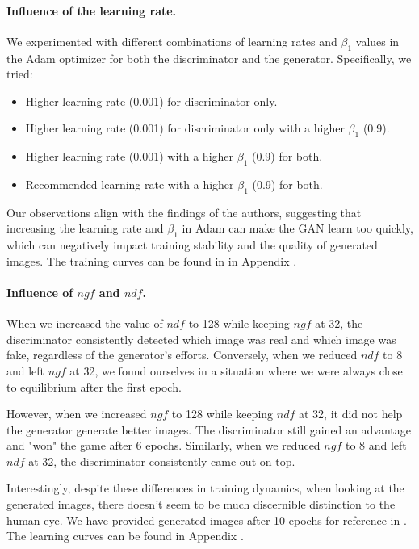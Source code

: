 \paragraph*{Influence of the learning rate.} We experimented with different combinations of learning rates and $\beta_1$ values in the Adam optimizer for both the discriminator and the generator. Specifically, we tried:

\begin{itemize}
    \item Higher learning rate (0.001) for discriminator only.
    \item Higher learning rate (0.001) for discriminator only with a higher $\beta_1$ (0.9).
    \item Higher learning rate (0.001) with a higher $\beta_1$ (0.9) for both.
    \item Recommended learning rate with a higher $\beta_1$ (0.9) for both.
\end{itemize}

Our observations align with the findings of the authors, suggesting that increasing the learning rate and $\beta_1$ in Adam can make the GAN learn too quickly, which can negatively impact training stability and the quality of generated images. The training curves can be found in  in Appendix . 

\paragraph*{Influence of $ngf$ and $ndf$.}

When we increased the value of $ndf$ to 128 while keeping $ngf$ at 32, the discriminator consistently detected which image was real and which image was fake, regardless of the generator's efforts. Conversely, when we reduced $ndf$ to 8 and left $ngf$ at 32, we found ourselves in a situation where we were always close to equilibrium after the first epoch.

However, when we increased $ngf$ to 128 while keeping $ndf$ at 32, it did not help the generator generate better images. The discriminator still gained an advantage and "won" the game after 6 epochs. Similarly, when we reduced $ngf$ to 8 and left $ndf$ at 32, the discriminator consistently came out on top.

Interestingly, despite these differences in training dynamics, when looking at the generated images, there doesn't seem to be much discernible distinction to the human eye. We have provided generated images after 10 epochs for reference in . 
The learning curves can be found in Appendix .


